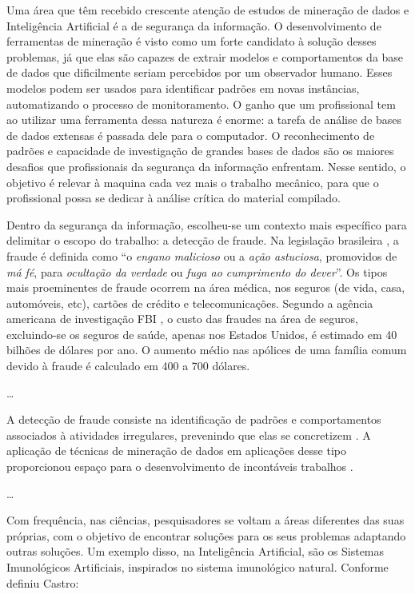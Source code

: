 Uma área que têm recebido crescente atenção de estudos de mineração de dados e Inteligência Artificial é a de segurança da informação. O desenvolvimento de ferramentas de mineração é visto como um forte candidato à solução desses problemas, já que elas são capazes de extrair modelos e comportamentos da base de dados que dificilmente seriam percebidos por um observador humano. Esses modelos podem ser usados para identificar padrões em novas instâncias, automatizando o processo de monitoramento. O ganho que um profissional tem ao utilizar uma ferramenta dessa natureza é enorme: a tarefa de análise de bases de dados extensas é passada dele para o computador. O reconhecimento de padrões e capacidade de investigação de grandes bases de dados são os maiores desafios que profissionais da segurança da informação enfrentam. Nesse sentido, o objetivo é relevar à maquina cada vez mais o trabalho mecânico, para que o profissional possa se dedicar à análise crítica do material compilado.

Dentro da segurança da informação, escolheu-se um contexto mais específico para delimitar o escopo do trabalho: a detecção de fraude. Na legislação brasileira \cite[p. 324]{DePlacido1982}, a fraude é definida como ``o \emph{engano malicioso} ou a \emph{ação astuciosa}, promovidos de \emph{má fé}, para \emph{ocultação da verdade} ou \emph{fuga ao cumprimento do dever}''. Os tipos mais proeminentes de fraude ocorrem na área médica, nos seguros (de vida, casa, automóveis, etc), cartões de crédito e telecomunicações. Segundo a agência americana de investigação FBI \cite{FBI2010}, o custo das fraudes na área de seguros, excluindo-se os seguros de saúde, apenas nos Estados Unidos, é estimado em 40 bilhões de dólares por ano. O aumento médio nas apólices de uma família comum devido à fraude é calculado em 400 a 700 dólares.

\ldots

A detecção de fraude consiste na identificação de padrões e comportamentos associados à atividades irregulares, prevenindo que elas se concretizem \cite{Phua2010}. A aplicação de técnicas de mineração de dados em aplicações desse tipo proporcionou espaço para o desenvolvimento de incontáveis trabalhos \cite{Phua2010}.

\ldots

Com frequência, nas ciências, pesquisadores se voltam a áreas diferentes das suas próprias, com o objetivo de encontrar soluções para os seus problemas adaptando outras soluções. Um exemplo disso, na Inteligência Artificial, são os Sistemas Imunológicos Artificiais, inspirados no sistema imunológico natural. Conforme definiu Castro:


